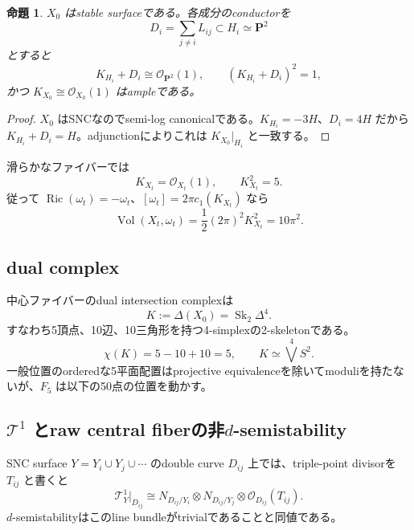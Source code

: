 \documentclass[11pt,a4paper]{ltjsarticle}
\newtheorem{proposition}[theorem]{命題}
\theoremstyle{definition}
\theoremstyle{remark}
\newcommand{\PP}{\mathbf P}
\newcommand{\Sk}{\operatorname{Sk}}
\newcommand{\Vol}{\operatorname{Vol}}
\newcommand{\Ric}{\operatorname{Ric}}
\begin{document}
\begin{proposition}\label{prop:stable}
$X_0$ はstable surfaceである。各成分のconductorを
\[
 D_i=\sum_{j\ne i}L_{ij}\subset H_i\simeq\PP^2
\]
とすると
\[
 K_{H_i}+D_i\cong\mathcal O_{\PP^2}(1),
 \qquad (K_{H_i}+D_i)^2=1,
\]
かつ $K_{X_0}\cong\mathcal O_{X_0}(1)$ はampleである。
\end{proposition}

\begin{proof}
$X_0$ はSNCなのでsemi-log canonicalである。$K_{H_i}=-3H$、$D_i=4H$ だから $K_{H_i}+D_i=H$。adjunctionによりこれは $K_{X_0}|_{H_i}$ と一致する。
\end{proof}

滑らかなファイバーでは
\begin{equation}\label{eq:canonical}
 K_{X_t}=\mathcal O_{X_t}(1),\qquad K_{X_t}^2=5.
\end{equation}
従って $\Ric(\omega_t)=-\omega_t$、$[\omega_t]=2\pi c_1(K_{X_t})$ なら
\begin{equation}\label{eq:volume}
 \Vol(X_t,\omega_t)=\frac12(2\pi)^2K_{X_t}^2=10\pi^2.
\end{equation}

\subsection{dual complex}

中心ファイバーのdual intersection complexは
\begin{equation}\label{eq:dualcomplex}
 K:=\Delta(X_0)=\Sk_2\Delta^4.
\end{equation}
すなわち5頂点、10辺、10三角形を持つ4-simplexの2-skeletonである。
\[
 \chi(K)=5-10+10=5,
 \qquad K\simeq\bigvee^4S^2.
\]
一般位置のorderedな5平面配置はprojective equivalenceを除いてmoduliを持たないが、$F_5$ は以下の50点の位置を動かす。

\subsection{$\mathcal T^1$ とraw central fiberの非$d$-semistability}

SNC surface $Y=Y_i\cup Y_j\cup\cdots$ のdouble curve $D_{ij}$ 上では、triple-point divisorを $T_{ij}$ と書くと
\begin{equation}\label{eq:dsemiformula}
 \mathcal T^1_Y|_{D_{ij}}
 \cong N_{D_{ij}/Y_i}\otimes N_{D_{ij}/Y_j}\otimes\mathcal O_{D_{ij}}(T_{ij}).
\end{equation}
$d$-semistabilityはこのline bundleがtrivialであることと同値である\cite{DoiYotsutani}。
\end{document}
